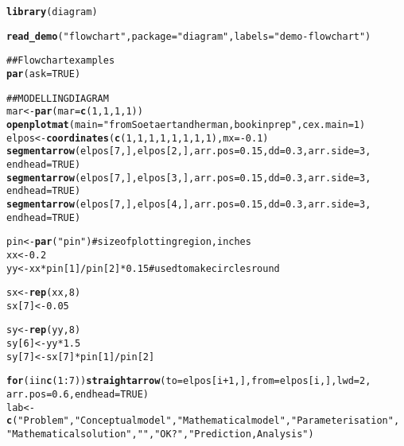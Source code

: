 \documentclass{article}\usepackage[]{graphicx}\usepackage[]{color}
\makeatletter
\newcommand{\hlfunctioncall}[1]{\textcolor[rgb]{0.501960784313725,0,0.329411764705882}{\textbf{#1}}}%
\newcommand{\hlstring}[1]{\textcolor[rgb]{0.6,0.6,1}{#1}}%
\newcommand{\hlcomment}[1]{\textcolor[rgb]{0.180392156862745,0.6,0.341176470588235}{#1}}%
\newenvironment{kframe}{%
 \def\at@end@of@kframe{}%
 \ifinner\ifhmode%
  \def\at@end@of@kframe{\end{minipage}}%
  \begin{minipage}{\columnwidth}%
 \fi\fi%
 \def\FrameCommand##1{\hskip\@totalleftmargin \hskip-\fboxsep
 \colorbox{shadecolor}{##1}\hskip-\fboxsep
     \hskip-\linewidth \hskip-\@totalleftmargin \hskip\columnwidth}%
 \MakeFramed {\advance\hsize-\width
   \@totalleftmargin\z@ \linewidth\hsize
   \@setminipage}}%
 {\par\unskip\endMakeFramed%
 \at@end@of@kframe}
\newenvironment{knitrout}{}{} %
\makeatother
\begin{document}
\begin{knitrout}
\color{fgcolor}\begin{kframe}
\begin{alltt}
\hlfunctioncall{library}(diagram)
\end{alltt}


{\ttfamily\noindent\itshape\color{messagecolor}{\#\# Loading required package: shape}}\begin{alltt}
\hlfunctioncall{read_demo}(\hlstring{"flowchart"}, package = \hlstring{"diagram"}, labels = \hlstring{"demo-flowchart"})
\end{alltt}
\end{kframe}
\end{knitrout}
\begin{knitrout}
\color{fgcolor}\begin{kframe}
\begin{alltt}
\hlcomment{## Flowchart examples}
\hlfunctioncall{par}(ask = TRUE)

\hlcomment{## MODELLING DIAGRAM}
mar <- \hlfunctioncall{par}(mar = \hlfunctioncall{c}(1, 1, 1, 1))
\hlfunctioncall{openplotmat}(main = \hlstring{"from Soetaert and herman, book in prep"}, cex.main = 1)
elpos <- \hlfunctioncall{coordinates}(\hlfunctioncall{c}(1, 1, 1, 1, 1, 1, 1, 1), mx = -0.1)
\hlfunctioncall{segmentarrow}(elpos[7, ], elpos[2, ], arr.pos = 0.15, dd = 0.3, arr.side = 3, 
    endhead = TRUE)
\hlfunctioncall{segmentarrow}(elpos[7, ], elpos[3, ], arr.pos = 0.15, dd = 0.3, arr.side = 3, 
    endhead = TRUE)
\hlfunctioncall{segmentarrow}(elpos[7, ], elpos[4, ], arr.pos = 0.15, dd = 0.3, arr.side = 3, 
    endhead = TRUE)

pin <- \hlfunctioncall{par}(\hlstring{"pin"})  # size of plotting region, inches
xx <- 0.2
yy <- xx * pin[1]/pin[2] * 0.15  \hlcomment{# used to make circles round}

sx <- \hlfunctioncall{rep}(xx, 8)
sx[7] <- 0.05

sy <- \hlfunctioncall{rep}(yy, 8)
sy[6] <- yy * 1.5
sy[7] <- sx[7] * pin[1]/pin[2]

\hlfunctioncall{for} (i in \hlfunctioncall{c}(1:7)) \hlfunctioncall{straightarrow}(to = elpos[i + 1, ], from = elpos[i, ], lwd = 2, 
    arr.pos = 0.6, endhead = TRUE)
lab <- \hlfunctioncall{c}(\hlstring{"Problem"}, \hlstring{"Conceptual model"}, \hlstring{"Mathematical model"}, \hlstring{"Parameterisation"}, 
    \hlstring{"Mathematical solution"}, \hlstring{""}, \hlstring{"OK?"}, \hlstring{"Prediction, Analysis"})


\end{alltt}
\end{kframe}
\end{knitrout}
\end{document}
